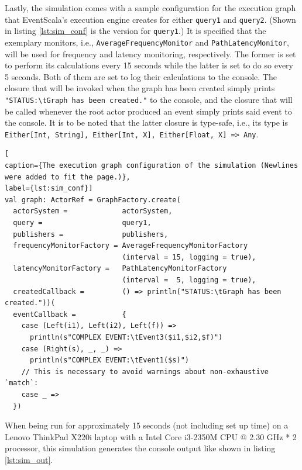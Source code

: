 \documentclass[article, 10pt, type=bsc, colorback, accentcolor=tud8b, parskip=half, bibliography=totocnumbered]{tudthesis}
\begin{document}
Lastly, the simulation comes with a sample configuration for the execution graph that EventScala's execution engine creates for either \lstinline{query1} and \lstinline{query2}.
(Shown in listing \ref{lst:sim_conf} is the version for \lstinline{query1}.)
It is specified that the exemplary monitors, i.e., \lstinline{AverageFrequencyMonitor} and \lstinline{PathLatencyMonitor}, will be used for frequency and latency monitoring, respectively.
The former is set to perform its calculations every 15 seconds while the latter is set to do so every 5 seconds.
Both of them are set to log their calculations to the console.
The closure that will be invoked when the graph has been created simply prints \lstinline{"STATUS:\tGraph has been created."} to the console, and the closure that will be called whenever the root actor produced an event simply prints said event to the console.
It is to be noted that the latter closure is type-safe, i.e., its type is \lstinline{Either[Int, String], Either[Int, X], Either[Float, X] => Any}.

\begin{lstlisting}[
caption={The execution graph configuration of the simulation (Newlines were added to fit the page.)},
label={lst:sim_conf}]
val graph: ActorRef = GraphFactory.create(
  actorSystem =             actorSystem,
  query =                   query1,
  publishers =              publishers,
  frequencyMonitorFactory = AverageFrequencyMonitorFactory 
                            (interval = 15, logging = true),
  latencyMonitorFactory =   PathLatencyMonitorFactory
                            (interval =  5, logging = true),
  createdCallback =         () => println("STATUS:\tGraph has been created."))(
  eventCallback =           {
    case (Left(i1), Left(i2), Left(f)) =>
      println(s"COMPLEX EVENT:\tEvent3($i1,$i2,$f)")
    case (Right(s), _, _) =>
      println(s"COMPLEX EVENT:\tEvent1($s)")
    // This is necessary to avoid warnings about non-exhaustive `match`:
    case _ =>
  })
\end{lstlisting}

When being run for approximately 15 seconds (not including set up time) on a Lenovo ThinkPad X220i laptop with a Intel Core i3-2350M CPU @ 2.30 GHz * 2 processor, this simulation generates the console output like shown in listing \ref{lst:sim_out}.
\end{document}
